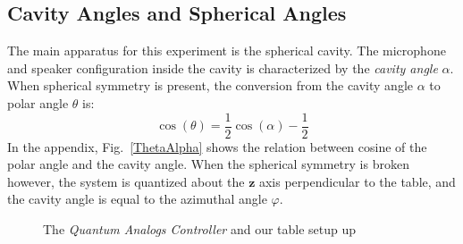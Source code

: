 \documentclass[12pt]{article}
\renewcommand{\vec}[1]{\mathbf{#1}} %
\newcommand{\figref}[1]{Fig.\ \ref{#1}}
\begin{document}
	
	\subsection{Cavity Angles and Spherical Angles}
	The main apparatus for this experiment is the spherical cavity. The microphone and speaker configuration inside the cavity is characterized by the \emph{cavity angle} $\alpha$. When spherical symmetry is present, the conversion from the cavity angle $\alpha$ to polar angle $\theta$ is:
		\begin{equation}
		\label{alpha2theta}
		\cos(\theta) = \frac{1}{2}\cos(\alpha) - \frac{1}{2}
		\end{equation}
	In the appendix, \figref{ThetaAlpha} shows the relation between cosine of the polar angle and the cavity angle. When the spherical symmetry is broken however, the system is quantized about the $\vec{z}$ axis perpendicular to the table, and the cavity angle is equal to the azimuthal angle $\varphi$.
	
	\begin{figure}[H]
		\captionsetup{justification = centering}
		\centering
		\qquad
		\caption{The \emph{Quantum Analogs Controller} \protect{} and our table setup up \protect{}}
		\label{experiment}
	\end{figure}

	
\end{document}
